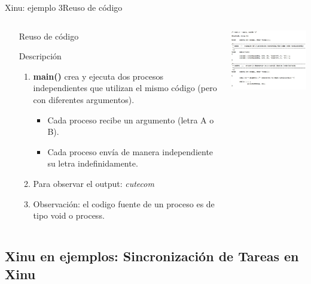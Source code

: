 \documentclass[8pt,aspectratio=169,compress]{beamer}
\begin{document}
\begin{frame}[fragile]{Xinu: ejemplo 3}{Reuso de código}

    \begin{columns}[onlytextwidth,T]
      \column{\dimexpr\linewidth-70mm-5mm}

\begin{small}
	\begin{itemize}
\bigskip
\item[]Reuso de código
  \item[Descripción]
\begin{enumerate}
\item \textbf{main()} crea y ejecuta dos procesos independientes que utilizan el mismo código (pero con diferentes argumentos).
	\begin{itemize}
\item Cada proceso recibe un argumento (letra A o B).
\item Cada proceso envía de manera independiente su letra indefinidamente.
	\end{itemize}

\bigskip
\item Para observar el output: \textit{cutecom}
\bigskip
\item Observación: el codigo fuente de un proceso es de tipo void o process.
\end{enumerate}
	\end{itemize}

\end{small}

      \column{70mm}
     \includegraphics[width=70mm]{images/ejemplo3.jpg}

    \end{columns}
\end{frame}





\subsection{Xinu en ejemplos: Sincronización de Tareas en Xinu}
\end{document}
